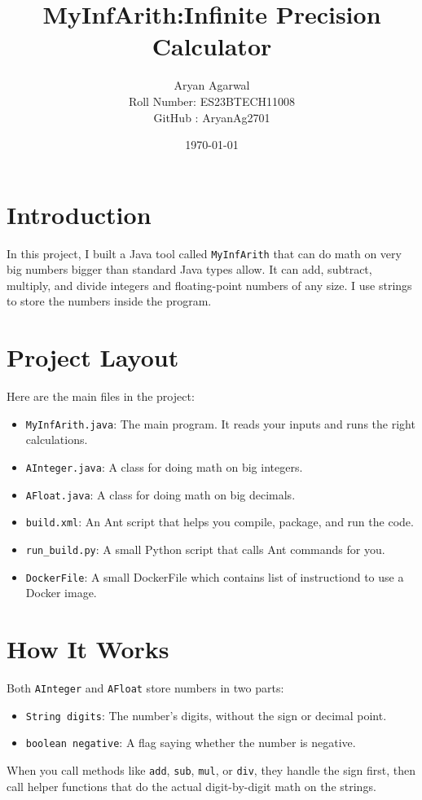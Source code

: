 \documentclass[11pt]{article}
\title{MyInfArith:Infinite Precision Calculator}
\author{Aryan Agarwal\\Roll Number: ES23BTECH11008\\GitHub : AryanAg2701}
\date{\today}
\begin{document}
\maketitle

\section{Introduction}
In this project, I built a Java tool called \texttt{MyInfArith} that can do math on very big numbers bigger than standard Java types allow. It can add, subtract, multiply, and divide integers and floating-point numbers of any size. I use strings to store the numbers inside the program.

\section{Project Layout}
Here are the main files in the project:
\begin{itemize}
  \item \texttt{MyInfArith.java}: The main program. It reads your inputs and runs the right calculations.
  \item \texttt{AInteger.java}: A class for doing math on big integers.
  \item \texttt{AFloat.java}: A class for doing math on big decimals.
  \item \texttt{build.xml}: An Ant script that helps you compile, package, and run the code.
  \item \texttt{run\_build.py}: A small Python script that calls Ant commands for you.
  \item \texttt{DockerFile}: A small DockerFile which contains list of instructiond to use a Docker image.
\end{itemize}

\section{How It Works}
Both \texttt{AInteger} and \texttt{AFloat} store numbers in two parts:
\begin{itemize}
  \item \texttt{String digits}: The number's digits, without the sign or decimal point.
  \item \texttt{boolean negative}: A flag saying whether the number is negative.
\end{itemize}

When you call methods like \texttt{add}, \texttt{sub}, \texttt{mul}, or \texttt{div}, they handle the sign first, then call helper functions that do the actual digit-by-digit math on the strings.
\end{document}
